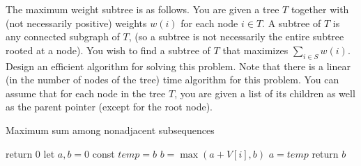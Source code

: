 \newpage
{} %

\problemdes

The maximum weight subtree is as follows. You are given a tree $T$ together with (not necessarily positive) weights $w(i)$ for each node $i \in T$. A subtree of $T$ is any connected subgraph of $T$, (so a subtree is not necessarily the entire subtree rooted at a node). You wish to find a subtree of $T$ that maximizes $\sum_{i \in S} w(i)$. Design an efficient algorithm for solving this problem. Note that there is a linear (in the number of nodes of the tree) time algorithm for this problem. You can assume that for each node in the tree $T$, you are given a list of its children as well as the parent pointer (except for the root node).

\solution




\begin{algorithm}[]
  \caption{Maximum sum among nonadjacent subsequences}
  {
    return 0\;
  }
  let $a, b = 0$\;
  {
    const $temp=b$\;
    $b = \max(a+V[i], b)$\;
    $a = temp$
  }
  return $b$\;
\end{algorithm}





